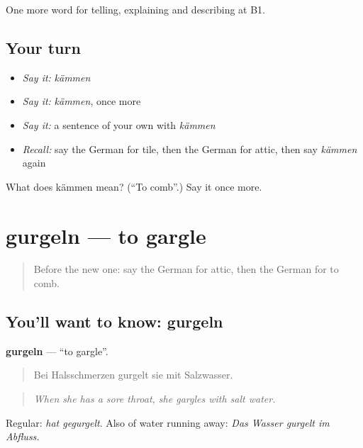 \begin{grammarlens}[title={What you've built}]
One more word for telling, explaining and describing at B1.
\end{grammarlens}

\subsection*{Your turn}
\begin{itemize}
\raggedright
  \item \emph{Say it:} \emph{kämmen}
  \item \emph{Say it:} \emph{kämmen}, once more
  \item \emph{Say it:} a sentence of your own with \emph{kämmen}
  \item \emph{Recall:} say the German for tile, then the German for attic, then say \emph{kämmen} again
\end{itemize}

\begin{tcolorbox}[breakable,colback=teal!4,colframe=teal!35!black,title={Before you move on}]
What does kämmen mean? (\textquotedblleft{}To comb\textquotedblright{}.) Say it once more.
\end{tcolorbox}
\section[gurgeln]{gurgeln — to gargle}

\label{lesson:GE-C530-gurgeln}



\begin{quote}
Before the new one: say the German for attic, then the German for to comb.
\end{quote}

\subsection*{You'll want to know: gurgeln}
\textbf{gurgeln} — \textquotedblleft{}to gargle\textquotedblright{}.

\begin{quote}
Bei Halsschmerzen gurgelt sie mit Salzwasser.
\end{quote}

\begin{quote}
\emph{When she has a sore throat, she gargles with salt water.}
\end{quote}

Regular: \emph{hat gegurgelt}. Also of water running away: \emph{Das Wasser gurgelt im Abfluss.}

